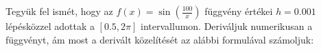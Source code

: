 Tegyük fel ismét, hogy az $f(x)=\sin(\frac{100}{x})$ függvény értékei
$h=0.001$ lépésközzel adottak a $[0.5,2\pi ]$ intervallumon.
Deriváljuk numerikusan a függvényt, ám most a derivált közelítését az alábbi
formulával számoljuk:

